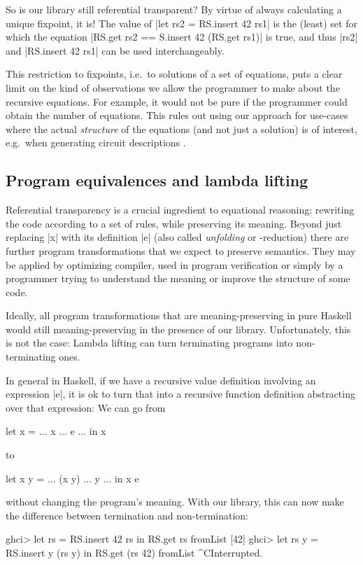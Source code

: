 \documentclass[manuscript,screen,acmsmall,nonacm]{acmart}
\begin{document}
So is our library still referential transparent? By virtue of always calculating a unique fixpoint, it is!  The value of |let rs2 = RS.insert 42 rs1| is the (least) set for which the equation |RS.get rs2 == S.insert 42 (RS.get rs1)| is true, and thus |rs2| and |RS.insert 42 rs1| can be used interchangeably.

This restriction to fixpoints, i.e.\ to solutions of a set of equations, puts a clear limit on the kind of observations we allow the programmer to make about the recursive equations. For example, it would not be pure if the programmer could obtain the number of equations. This rules out using our approach for use-cases where the actual \emph{structure} of the equations (and not just a solution) is of interest, e.g.\ when generating circuit descriptions \cite{observable-sharing}.

\subsection{Program equivalences and lambda lifting}\label{sec:sat}

Referential transparency is a crucial ingredient to equational reasoning: rewriting the code according to a set of rules, while preserving its meaning. Beyond just replacing |x| with its definition |e| (also called \emph{unfolding} or \textdelta-reduction) there are further program transformations that we expect to preserve semantics. They may be applied by optimizing compiler, used in program verification or simply by a programmer trying to understand the meaning or improve the structure of some code.

Ideally, all program transformations that are meaning-preserving in pure Haskell would still meaning-preserving in the presence of our library. Unfortunately, this is not the case: Lambda lifting can turn terminating programs into non-terminating ones.

In general in Haskell, if we have a recursive value definition involving an expression |e|, it is ok to turn that into a recursive function definition abstracting over that expression: We can go from
\begin{code}
let x = ... x ... e ... in x
\end{code}
to
\begin{code}
let x y = ... (x y) ... y ... in x e
\end{code}
without changing the program's meaning. With our library, this can now make the difference between termination and non-termination:
\begin{code}
ghci> let rs = RS.insert 42 rs in RS.get rs
fromList [42]
ghci> let rs y = RS.insert y (rs y) in RS.get (rs 42)
fromList ^CInterrupted.
\end{code}
\end{document}
